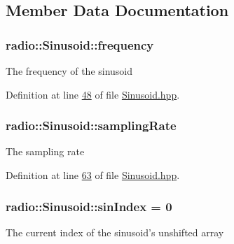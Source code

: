 \subsection{Member Data Documentation}
\hypertarget{classradio_1_1Sinusoid_ad429b5dd330e96aaf89a0d48ef59d3f2}{
\subsubsection[{frequency}]{ radio\+::\+Sinusoid\+::frequency\hspace{0.3cm}{\ttfamily [protected]}}}\label{classradio_1_1Sinusoid_ad429b5dd330e96aaf89a0d48ef59d3f2}
The frequency of the sinusoid 

Definition at line \hyperlink{Sinusoid_8hpp_source_l00048}{48} of file \hyperlink{Sinusoid_8hpp_source}{Sinusoid.\+hpp}.

\hypertarget{classradio_1_1Sinusoid_a964d64aae9acc4ea5d752534a33d76b8}{
\subsubsection[{sampling\+Rate}]{ radio\+::\+Sinusoid\+::sampling\+Rate\hspace{0.3cm}{\ttfamily [protected]}}}\label{classradio_1_1Sinusoid_a964d64aae9acc4ea5d752534a33d76b8}
The sampling rate 

Definition at line \hyperlink{Sinusoid_8hpp_source_l00063}{63} of file \hyperlink{Sinusoid_8hpp_source}{Sinusoid.\+hpp}.

\hypertarget{classradio_1_1Sinusoid_a2e7d029c5e7307967c77959367cc0224}{
\subsubsection[{sin\+Index}]{ radio\+::\+Sinusoid\+::sin\+Index = 0\hspace{0.3cm}{\ttfamily [protected]}}}\label{classradio_1_1Sinusoid_a2e7d029c5e7307967c77959367cc0224}
The current index of the sinusoid's unshifted array 

